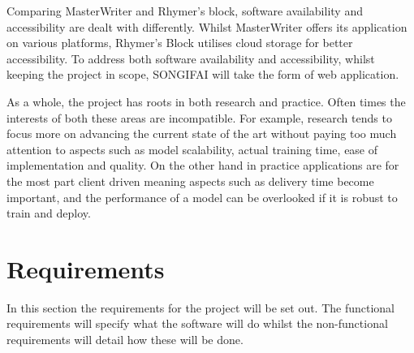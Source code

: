 \noindent
\newline
Comparing MasterWriter and Rhymer's block, software availability and accessibility are dealt with differently. Whilst MasterWriter offers its application on various platforms, Rhymer's Block utilises cloud storage for better accessibility. To address both software availability and accessibility, whilst keeping the project in scope, SONGIFAI will take the form of web application.  

\noindent
\newline
As a whole, the project has roots in both research and practice. Often times the interests of both these areas are incompatible. For example, research tends to focus more on advancing the current state of the art without paying too much attention to aspects such as model scalability, actual training time, ease of implementation and quality. On the other hand in practice applications  are for the most part client driven meaning aspects such as delivery time become important, and the performance of a model can be overlooked if it is robust to train and deploy. 
\newline
\newline
\newline
\newline
\section{Requirements}
In this section the requirements for the project will be set out. The functional requirements will specify what the software will do whilst the non-functional requirements will detail how these will be done.
\newline
\newline
\newline
\newline
